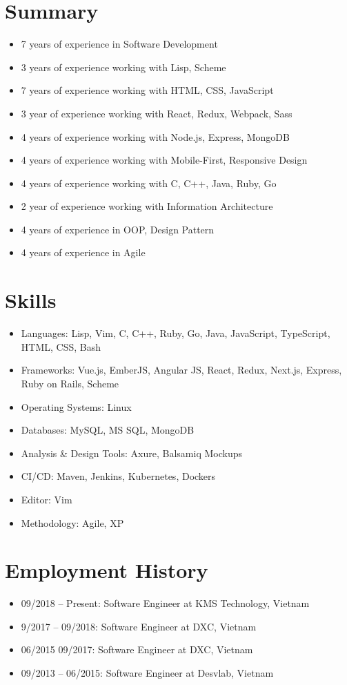 \documentclass[10pt, letterpapaer]{article}
\begin{document}
\section{Summary}
\begin{itemize}
  \item 7 years of experience in Software Development
  \item 3 years of experience working with Lisp, Scheme
  \item 7 years of experience working with HTML, CSS, JavaScript
  \item 3 year of experience working with React, Redux, Webpack, Sass
  \item 4 years of experience working with Node.js, Express, MongoDB
  \item 4 years of experience working with Mobile-First, Responsive Design
  \item 4 years of experience working with C, C++, Java, Ruby, Go
  \item 2 year of experience working with Information Architecture
  \item 4 years of experience in OOP, Design Pattern
  \item 4 years of experience in Agile 
\end{itemize}

\section{Skills}
\begin{itemize}
  \item Languages: Lisp, Vim, C, C++, Ruby, Go, Java, JavaScript, TypeScript, HTML, CSS, Bash
  \item Frameworks: Vue.js, EmberJS, Angular JS, React, Redux, Next.js, Express, Ruby on Rails, Scheme
  \item Operating Systems: Linux
  \item Databases: MySQL, MS SQL, MongoDB
  \item Analysis \& Design Tools: Axure, Balsamiq Mockups
  \item CI/CD: Maven, Jenkins, Kubernetes, Dockers
  \item Editor: Vim
  \item Methodology:  Agile, XP
\end{itemize}

\section{Employment History}
\begin{itemize}
  \item 09/2018 – Present: Software Engineer at KMS Technology, Vietnam
  \item 9/2017 – 09/2018: Software Engineer at DXC, Vietnam
  \item 06/2015  09/2017: Software Engineer at DXC, Vietnam
  \item 09/2013 – 06/2015: Software Engineer at Desvlab, Vietnam
\end{itemize}
\end{document}
